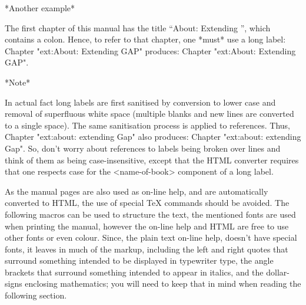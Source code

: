 *Another example*

The first chapter of this manual has the title ``About: Extending {\GAP}'',
which contains a colon. Hence, to refer to that chapter, one *must* use a
long label: 
\begintt
Chapter "ext:About: Extending GAP"
\endtt
produces: Chapter "ext:About: Extending GAP".

*Note*

In actual fact long labels are first sanitised by conversion to lower case
and removal of superfluous white space (multiple blanks and new lines are
converted to a single space). The same sanitisation process is applied to
references. Thus, 
\begintt
Chapter "ext:about:                                             extending
Gap"
\endtt
also produces: 
Chapter "ext:about:                                             extending
Gap". So, don't worry about references to labels being broken over  lines
and think of  them  as  being  case-insensitive,  except  that  the  HTML
converter  requires  that  one  respects  case  for  the   <name-of-book>
component of a long label.


\indextt{\\lq}\indextt{\\pif}\indextt{\\rq}
\indextt{\\>}\indextt{\\index}\indextt{\\indextt}
\indextt{\\atindex}
\indextt{\\fmark}
\indextt{\\URL}\indextt{\\Mailto}
\indextt{\\Package}\indextt{\\package}
As the manual pages are also used as on-line help, and are  automatically
converted to HTML, the use of special {\TeX} commands should be  avoided.
The following macros can be used to structure  the  text,  the  mentioned
fonts are used when printing the manual, however  the  on-line  help  and
HTML are free to use other fonts or even colour. Since,  the  plain  text
on-line help, doesn't have special  fonts,  it  leaves  in  much  of  the
markup, including the left  and  right  quotes  that  surround  something
intended to be displayed in typewriter  type,  the  angle  brackets  that
surround something intended to appear in italics,  and  the  dollar-signs
enclosing mathematics; you will need to keep that in  mind  when  reading
the following section.

